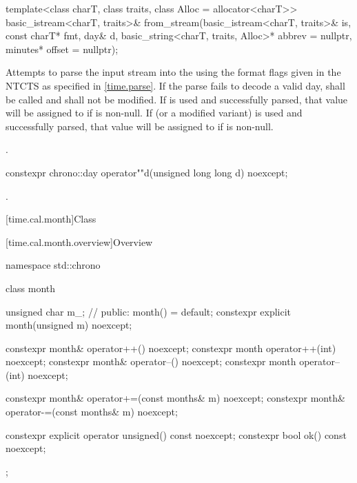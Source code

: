 %
\begin{itemdecl}
template<class charT, class traits, class Alloc = allocator<charT>>
  basic_istream<charT, traits>&
    from_stream(basic_istream<charT, traits>& is, const charT* fmt,
                day& d, basic_string<charT, traits, Alloc>* abbrev = nullptr,
                minutes* offset = nullptr);
\end{itemdecl}

\begin{itemdescr}
\pnum
\effects
Attempts to parse the input stream 
into the   using
the format flags given in the NTCTS 
as specified in \ref{time.parse}.
If the parse fails to decode a valid day,
 shall be called
and  shall not be modified.
If  is used and successfully parsed,
that value will be assigned to  if  is non-null.
If  (or a modified variant) is used and successfully parsed,
that value will be assigned to  if  is non-null.

\pnum
\returns
{}.
\end{itemdescr}

%
\begin{itemdecl}
constexpr chrono::day operator""d(unsigned long long d) noexcept;
\end{itemdecl}

\begin{itemdescr}
\pnum
\returns
{}.
\end{itemdescr}

[time.cal.month]{Class }

[time.cal.month.overview]{Overview}

\begin{codeblock}
namespace std::chrono {
  class month {
    unsigned char m_;           // \expos
  public:
    month() = default;
    constexpr explicit month(unsigned m) noexcept;

    constexpr month& operator++()    noexcept;
    constexpr month  operator++(int) noexcept;
    constexpr month& operator--()    noexcept;
    constexpr month  operator--(int) noexcept;

    constexpr month& operator+=(const months& m) noexcept;
    constexpr month& operator-=(const months& m) noexcept;

    constexpr explicit operator unsigned() const noexcept;
    constexpr bool ok() const noexcept;
  };
}
\end{codeblock}

